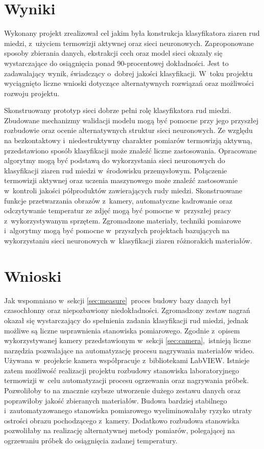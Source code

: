 \section{Wyniki}
Wykonany projekt zrealizował cel jakim była konstrukcja klasyfikatora ziaren rud
miedzi, z~użyciem termowizji aktywnej oraz sieci neuronowych.
Zaproponowane sposoby zbierania danych, ekstrakcji cech oraz model sieci okazały
się wystarczające do osiągnięcia ponad 90-procentowej
dokładności.
Jest to zadawalający wynik, świadczący o~dobrej jakości klasyfikacji.
W~toku projektu wyciągnięto liczne wnioski dotyczące alternatywnych rozwiązań
oraz możliwości rozwoju projektu.

Skonstruowany prototyp sieci dobrze pełni rolę klasyfikatora rud miedzi.
Zbudowane mechanizmy walidacji modelu mogą być pomocne przy jego przyszłej
rozbudowie oraz ocenie alternatywnych struktur sieci neuronowych.
Ze względu na bezkontaktowy i~niedestruktywny charakter pomiarów termowizją
aktywną, przedstawiono sposób klasyfikacji może znaleźć liczne zastosowania.
Opracowane algorytmy mogą być podstawą do wykorzystania sieci neuronowych do
klasyfikacji ziaren rud miedzi w~środowisku przemysłowym.
Połączenie termowizji aktywnej oraz uczenia maszynowego może znaleźć
zastosowanie w~kontroli jakości półproduktów zawierających rudy miedzi.
Skonstruowane funkcje przetwarzania obrazów z~kamery, automatyczne kadrowanie
oraz odczytywanie temperatur ze zdjęć mogą być pomocne w~przyszłej pracy
z~wykorzystywanym sprzętem.
Zgromadzone materiały, techniki pomiarowe i~algorytmy mogą być pomocne
w~przyszłych projektach bazujących na wykorzystaniu sieci neuronowych
w~klasyfikacji ziaren różnorakich materiałów.

\section{Wnioski}
Jak wspomniano w~sekcji \ref{sec:measure}~proces budowy bazy danych był
czasochłonny oraz niepozbawiony niedokładności.
Zgromadzony zestaw nagrań okazał się wystarczający do spełnienia zadania
klasyfikacji rud miedzi, jednak możliwe są liczne usprawnienia stanowiska
pomiarowego.
Zgodnie z~opisem wykorzystywanej kamery przedstawionym w~sekcji
\ref{sec:camera},~istnieją liczne narzędzia pozwalające na automatyzację
procesu nagrywania materiałów wideo.
Używana w~projekcie kamera współpracuje z~bibliotekami LabVIEW.
Istnieje zatem możliwość realizacji projektu rozbudowy stanowiska
laboratoryjnego termowizji w~celu automatyzacji procesu ogrzewania oraz
nagrywania próbek.
Pozwoliłoby to na znacznie szybsze utworzenie dużego zestawu danych oraz
poprawiłoby jakość zbieranych materiałów.
Budowa bardziej stabilnego i~zautomatyzowanego stanowiska pomiarowego
wyeliminowałaby ryzyko utraty ostrości obrazu pochodzącego z~kamery.
Dodatkowo rozbudowa stanowiska pozwoliłaby na realizację alternatywnej
metody pomiarów, polegającej na ogrzewaniu próbek do osiągnięcia zadanej
temperatury.

